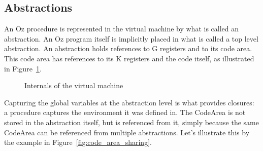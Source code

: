 \documentclass[a4paper]{memoir}
\begin{document}
\subsection{Abstractions}\label{sec:vm:abstractions}
An Oz procedure is represented in the virtual machine by what is called an abstraction. An Oz program itself is implicitly placed in what is called a top level abstraction.
An abstraction holds references to G registers and to its code area. This code
area has references to its K registers and the code itself, as illustrated in
Figure~\ref{fig:internal_virtual_machine}.

\begin{figure}[h]
\caption{Internals of the virtual machine}
\label{fig:internal_virtual_machine}
\end{figure}
Capturing the global variables at the abstraction level is what provides
closures: a procedure captures the environment it was defined in.
The CodeArea is not stored in the abstraction itself, but is referenced from
it, simply because the same CodeArea can be referenced from multiple
abstractions. Let's illustrate this by the example in
Figure~\ref{fig:code_area_sharing}.
\end{document}
